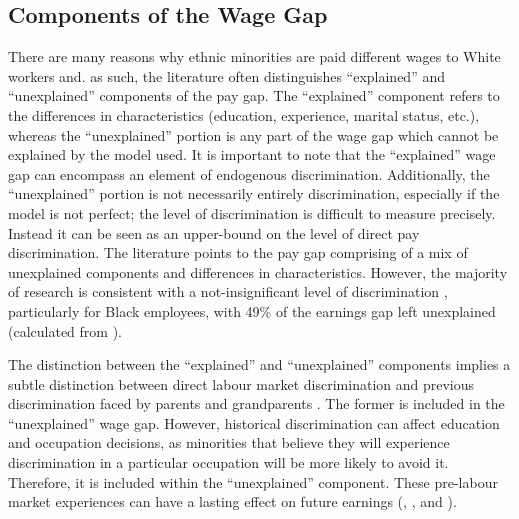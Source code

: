 \documentclass[class=article, crop=false]{standalone}
\begin{document}
\subsection{Components of the Wage Gap}
\label{sec:components}
There are many reasons why ethnic minorities are paid different wages to White workers and. as such, the literature often distinguishes \enquote{explained} and \enquote{unexplained} components of the pay gap. The \enquote{explained} component refers to the differences in characteristics (education, experience, marital status, etc.), whereas the \enquote{unexplained} portion is any part of the wage gap which cannot be explained by the model used. It is important to note that the \enquote{explained} wage gap can encompass an element of endogenous discrimination. Additionally, the \enquote{unexplained} portion is not necessarily entirely discrimination, especially if the model is not perfect; the level of discrimination is difficult to measure precisely. Instead it can be seen as an upper-bound on the level of direct pay discrimination. The literature points to the pay gap comprising of a mix of unexplained components and differences in characteristics. However, the majority of research is consistent with a not-insignificant level of discrimination \citep{Metcalf}, particularly for Black employees, with 49\% of the earnings gap left unexplained (calculated from \citet[p.~374]{Blackaby}).

The distinction between the \enquote{explained} and \enquote{unexplained} components implies a subtle distinction between direct labour market discrimination and previous discrimination faced by parents and grandparents \citep{Lundberg}. The former is included in the \enquote{unexplained} wage gap. However, historical discrimination can affect education and occupation decisions, as minorities that believe they will experience discrimination in a particular occupation will be more likely to avoid it. Therefore, it is included within the \enquote{unexplained} component. These pre-labour market experiences can have a lasting effect on future earnings (\citet{Altonji}, \citet{Hedman}, and \citet{Berthoud}).
\end{document}
